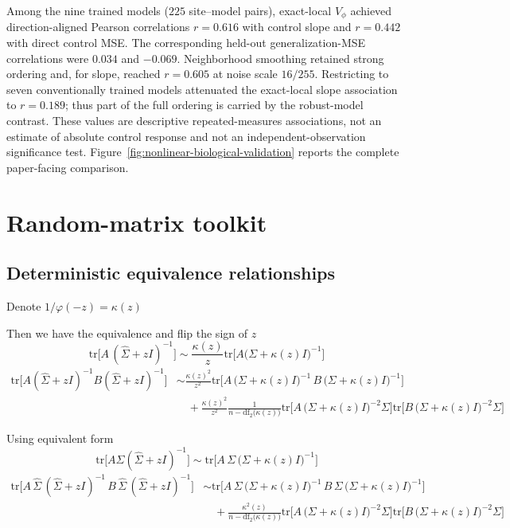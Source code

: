 Among the nine trained models ($225$ site--model pairs), exact-local
$V_\phi$ achieved direction-aligned Pearson correlations $r=0.616$ with
control slope and $r=0.442$ with direct control MSE. The corresponding
held-out generalization-MSE correlations were $0.034$ and $-0.069$.
Neighborhood smoothing retained strong ordering and, for slope, reached
$r=0.605$ at noise scale $16/255$. Restricting to seven conventionally
trained models attenuated the exact-local slope association to $r=0.189$;
thus part of the full ordering is carried by the robust-model contrast.
These values are descriptive repeated-measures associations, not an estimate
of absolute control response and not an independent-observation significance
test. Figure~\ref{fig:nonlinear-biological-validation} reports the complete
paper-facing comparison.
\endgroup




\section{Random-matrix toolkit}
\label{sec:app-rmt-toolkit}
\label{sec:app-de-toolkit}

\subsection{Deterministic equivalence relationships}
\label{sec:app-de-identities}

Denote $1/\varphi(-z)=\kappa(z)$

Then we have the equivalence and flip the sign of $z$
\[
\mbox{tr}\bigl[A\,(\widehat{\Sigma}+zI)^{-1}\bigr]\sim\frac{\kappa(z)}{z}\mbox{tr}\bigl[A\bigl(\Sigma+\kappa(z)I\bigr)^{-1}\bigr]
\]
\begin{align*}
\mbox{tr}\bigl[A(\widehat{\Sigma}+zI)^{-1}B(\widehat{\Sigma}+zI)^{-1}\bigr] & \sim\frac{\kappa(z)^{2}}{z^{2}\,}\mbox{tr}\bigl[A\,\bigl(\Sigma+\kappa(z)I\bigr)^{-1}\,B\,\bigl(\Sigma+\kappa(z)I\bigr)^{-1}\bigr]\\
 & \quad+\frac{\kappa(z)^{2}}{z^{2}}\frac{1}{n-\mathrm{df}_{2}\bigl(\kappa(z)\bigr)}\mbox{tr}\bigl[A\,\bigl(\Sigma+\kappa(z)I\bigr)^{-2}\Sigma\bigr]\mbox{tr}\bigl[B\,\bigl(\Sigma+\kappa(z)I\bigr)^{-2}\Sigma\bigr]
\end{align*}

Using equivalent form
\[
\mbox{tr}\bigl[A\widehat{\Sigma}(\widehat{\Sigma}+zI)^{-1}\bigr]\sim\mbox{tr}\bigl[A\,\Sigma\,\bigl(\Sigma+\kappa(z)I\bigr)^{-1}\bigr]
\]
\begin{align*}
\mbox{tr}\bigl[A\,\widehat{\Sigma}\,(\widehat{\Sigma}+zI)^{-1}\,B\,\widehat{\Sigma}\,(\widehat{\Sigma}+zI)^{-1}\bigr] & \sim\mbox{tr}\bigl[A\,\Sigma\,\bigl(\Sigma+\kappa(z)I\bigr)^{-1}\,B\,\Sigma\,\bigl(\Sigma+\kappa(z)I\bigr)^{-1}\bigr]\\
 & \quad+\frac{\kappa^{2}(z)}{n-\mathrm{df}_{2}\bigl(\kappa(z)\bigr)}\mbox{tr}\bigl[A\,\bigl(\Sigma+\kappa(z)I\bigr)^{-2}\Sigma\bigr]\mbox{tr}\bigl[B\,\bigl(\Sigma+\kappa(z)I\bigr)^{-2}\Sigma\bigr]
\end{align*}

